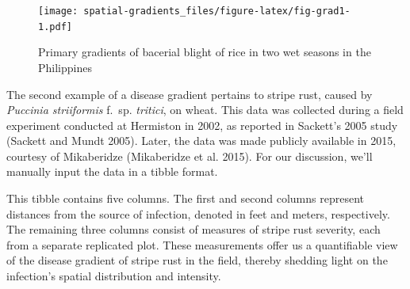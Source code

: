 \documentclass[
  letterpaper,
]{book}
\begin{document}
\begin{figure}

\texttt{[image: spatial-gradients\_files/figure-latex/fig-grad1-1.pdf]} \hfill{}

\caption{\label{fig-grad1}Primary gradients of bacerial blight of rice
in two wet seasons in the Philippines}

\end{figure}

The second example of a disease gradient pertains to stripe rust, caused
by \emph{Puccinia striiformis} f.~sp. \emph{tritici}, on wheat. This
data was collected during a field experiment conducted at Hermiston in
2002, as reported in Sackett's 2005 study (Sackett and Mundt 2005).
Later, the data was made publicly available in 2015, courtesy of
Mikaberidze (Mikaberidze et al. 2015). For our discussion, we'll
manually input the data in a tibble format.

This tibble contains five columns. The first and second columns
represent distances from the source of infection, denoted in feet and
meters, respectively. The remaining three columns consist of measures of
stripe rust severity, each from a separate replicated plot. These
measurements offer us a quantifiable view of the disease gradient of
stripe rust in the field, thereby shedding light on the infection's
spatial distribution and intensity.
\end{document}
